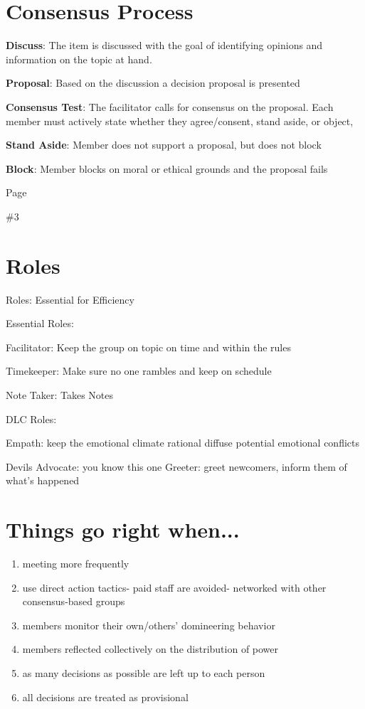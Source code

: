 \documentclass{article}
\begin{document}
	\begin{center}
	\end{center}
	 \newpage%
	 
	\section{Consensus Process}
	
	\textbf{Discuss}: The item is discussed with the goal of identifying opinions and information on the topic at hand.
	
	\textbf{Proposal}: Based on the discussion a decision proposal is presented
	
	\textbf{Consensus Test}: The facilitator calls for consensus on the proposal. Each member must actively state whether they agree/consent, stand aside, or object,
	
	\textbf{Stand Aside}: Member does not support a proposal, but does not block
	
	\textbf{Block}: Member blocks on moral or ethical grounds and the proposal fails
	
	\newpage
	Page\par \#3\newpage
		\section{Roles}
	Roles: Essential for      Efficiency
	
	Essential Roles:        
	
	Facilitator: Keep the group on topic on time and within the rules        
	
	Timekeeper: Make sure no one rambles and keep on schedule         
	
	 Note Taker: Takes Notes     
	 
	 DLC Roles:   
	 
	 Empath: keep the emotional climate rational diffuse potential emotional conflicts    
	 
	 Devils Advocate: you know this one    Greeter: greet newcomers, inform them of what's happened
	
	\newpage
	\section{Things go right when...}
	\begin{enumerate}
	\item meeting more frequently
	\item use direct action tactics- paid staff are avoided- networked with other  consensus-based groups
	\item members monitor their own/others’ domineering behavior
	\item members reflected collectively on the distribution of power
	\item as many decisions as possible are left up to each person
	\item all decisions are treated as provisional
	\end{enumerate}
	\newpage
\end{document}
